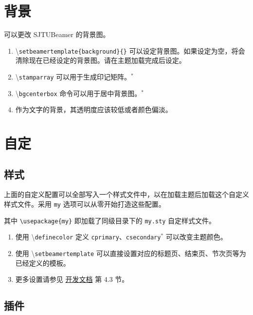 \documentclass[
    UTF8,
    heading=true,
    12pt,
    a4paper
]{ctexrep}
\newenvironment{commentlist}
{\begin{enumerate}\small}
{\end{enumerate}}
\newcommand{\cmd}[1]{\textbackslash{}\texttt{#1}}
\newcommand{\opt}[1]{\texttt{#1}}
\def\themename{\textsf{SJTUBeamer}}
\begin{document}
\chapter{背景}

可以更改 \themename{} 的背景图。


\begin{commentlist}
  \item \cmd{setbeamertemplate\{background\}\{\}}
  可以设定背景图。如果设定为空，将会清除现在已经设定的背景图。请在主题加载完成后设定。
  \item \cmd{stamparray} 可以用于生成印记矩阵。$^*$
  \item \cmd{bgcenterbox} 命令可以用于居中背景图。$^*$
  \item 作为文字的背景，其透明度应该较低或者颜色偏淡。
\end{commentlist}

\chapter{自定}

\section{样式}

上面的自定义配置可以全部写入一个样式文件中，以在加载主题后加载这个自定义样式文件。采用
\texttt{my} 选项可以从零开始打造这些配置。


其中 \verb"\usepackage{my}" 即加载了同级目录下的
\verb"my.sty" 自定样式文件。


\begin{commentlist}
  \item 使用 \cmd{definecolor} 定义
  \opt{cprimary}、\opt{csecondary}$^*$ 可以改变主题颜色。
  \item 使用 \cmd{setbeamertemplate}
  可以直接设置对应的标题页、结束页、节次页等为已经定义的模板。
  \item 更多设置请参见
  \href{run:sjtubeamerdevguide.pdf}{开发文档}
  第 4.3 节。
\end{commentlist}

\section{插件}
\end{document}
